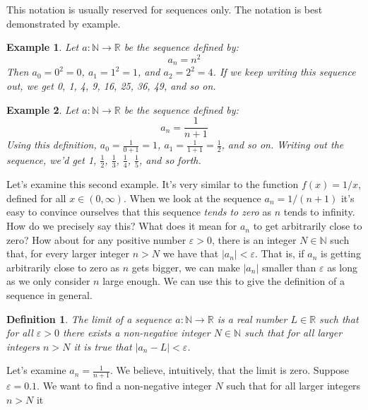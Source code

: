 \documentclass{article}
\theoremstyle{normal}
\newtheorem{definition}{Definition}
\newtheorem{example}{Example}
\theoremstyle{plain}
\begin{document}
    This notation is usually reserved for sequences only. The notation is best
    demonstrated by example.
    \begin{example}
        Let $a:\mathbb{N}\rightarrow\mathbb{R}$ be the sequence defined by:
        \begin{equation}
            a_{n}=n^{2}
        \end{equation}
        Then $a_{0}=0^{2}=0$, $a_{1}=1^{2}=1$, and $a_{2}=2^{2}=4$. If we keep
        writing this sequence out, we get 0, 1, 4, 9, 16, 25, 36, 49, and so on.
    \end{example}
    \begin{example}
        Let $a:\mathbb{N}\rightarrow\mathbb{R}$ be the sequence defined by:
        \begin{equation}
            a_{n}=\frac{1}{n+1}
        \end{equation}
        Using this definition, $a_{0}=\frac{1}{0+1}=1$,
        $a_{1}=\frac{1}{1+1}=\frac{1}{2}$, and so on. Writing out the sequence,
        we'd get 1, $\frac{1}{2}$, $\frac{1}{3}$, $\frac{1}{4}$,
        $\frac{1}{5}$, and so forth.
    \end{example}
    Let's examine this second example. It's very similar to the function
    $f(x)=1/x$, defined for all $x\in(0,\infty)$. When we look at the sequence
    $a_{n}=1/(n+1)$ it's easy to convince ourselves that this sequence
    \textit{tends to zero} as $n$ tends to infinity. How do we precisely say
    this? What does it mean for $a_{n}$ to get arbitrarily close to zero?
    How about for any positive number $\varepsilon>0$, there is an integer
    $N\in\mathbb{N}$ such that, for every larger integer $n>N$ we have that
    $|a_{n}|<\varepsilon$. That is, if $a_{n}$ is getting arbitrarily close to
    zero as $n$ gets bigger, we can make $|a_{n}|$ smaller than $\varepsilon$
    as long as we only consider $n$ large enough. We can use this to give the
    definition of a sequence in general.
    \begin{definition}
        The limit of a sequence $a:\mathbb{N}\rightarrow\mathbb{R}$ is a real
        number $L\in\mathbb{R}$ such that for all $\varepsilon>0$ there exists
        a non-negative integer $N\in\mathbb{N}$ such that for all larger
        integers $n>N$ it is true that $|a_{n}-L|<\varepsilon$.
    \end{definition}
    Let's examine $a_{n}=\frac{1}{n+1}$. We believe, intuitively, that the
    limit is zero. Suppose $\varepsilon=0.1$. We want to
    find a non-negative integer $N$ such that for all larger integers $n>N$ it
\end{document}
